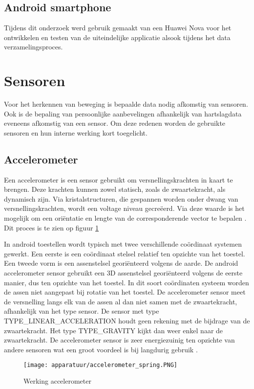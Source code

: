 \subsection{Android smartphone}
Tijdens dit onderzoek werd gebruik gemaakt van een Huawei Nova voor het ontwikkelen en testen van de uiteindelijke applicatie alsook tijdens het data verzamelingsproces.  

\section{Sensoren}
Voor het herkennen van beweging is bepaalde data nodig afkomstig van sensoren. Ook is de bepaling van persoonlijke aanbevelingen afhankelijk van hartslagdata eveneens afkomstig van een sensor. Om deze redenen worden de gebruikte sensoren en hun interne werking kort toegelicht.

\subsection{Accelerometer}
Een accelerometer is een sensor gebruikt om versnellingskrachten in kaart te brengen. Deze krachten kunnen zowel statisch, zoals de zwaartekracht, als dynamisch zijn. 
Via kristalstructuren, die gespannen worden onder dwang van versnellingskrachten, wordt een voltage niveau gecreëerd. Via deze waarde is het mogelijk om een oriëntatie en lengte van de corresponderende vector te bepalen \cite{ref54}. Dit proces is te zien op figuur \ref{fig:werkingacc}

In android toestellen wordt typisch met twee verschillende coördinaat systemen gewerkt. Een eerste is een coördinaat stelsel relatief ten opzichte van het toestel. Een tweede vorm is een assenstelsel georiënteerd volgens de aarde.
De android accelerometer sensor gebruikt een 3D assenstelsel georiënteerd volgens de eerste manier, dus ten opzichte van het toestel. In dit soort coördinaten systeem worden de assen niet aangepast bij rotatie van het toestel.
De accelerometer sensor meet de versnelling langs elk van de assen al dan niet samen met de zwaartekracht, afhankelijk van het type sensor. De sensor met type TYPE\_LINEAR\_ACCELERATION houdt geen rekening met de bijdrage van de zwaartekracht. Het type TYPE\_GRAVITY kijkt dan weer enkel naar de zwaartekracht. 
De accelerometer sensor is zeer energiezuinig ten opzichte van andere sensoren wat een groot voordeel is bij langdurig gebruik \cite{ref55}.

\begin{figure}
\centering
\caption{Werking accelerometer \cite{ref56}}\label{fig:werkingacc}
\texttt{[image: apparatuur/accelerometer\_spring.PNG]}
\end{figure} 

